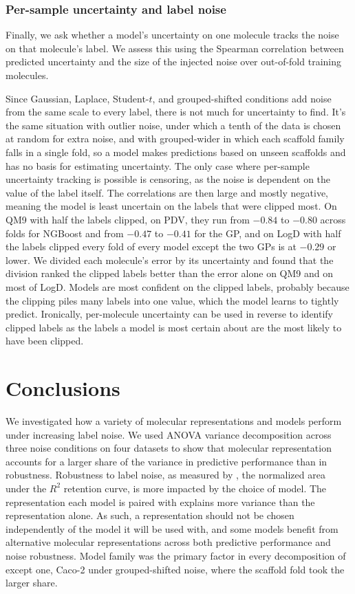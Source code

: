 \subsubsection{Per-sample uncertainty and label noise}\label{sec:uq_per_sample}

Finally, we ask whether a model's uncertainty on one molecule tracks the noise on that molecule's label. We assess this using the Spearman correlation between predicted uncertainty and the size of the injected noise over out-of-fold training molecules.

Since Gaussian, Laplace, Student-$t$, and grouped-shifted conditions add noise from the same scale to every label, there is not much for uncertainty to find. It's the same situation with outlier noise, under which a tenth of the data is chosen at random for extra noise, and with grouped-wider in which each scaffold family falls in a single fold, so a model makes predictions based on unseen scaffolds and has no basis for estimating uncertainty. The only case where per-sample uncertainty tracking is possible is censoring, as the noise is dependent on the value of the label itself. The correlations are then large and mostly negative, meaning the model is least uncertain on the labels that were clipped most. On QM9 with half the labels clipped, on PDV, they run from $-0.84$ to $-0.80$ across folds for NGBoost and from $-0.47$ to $-0.41$ for the GP, and on LogD with half the labels clipped every fold of every model except the two GPs is at $-0.29$ or lower. We divided each molecule's error by its uncertainty and found that the division ranked the clipped labels better than the error alone on QM9 and on most of LogD. Models are most confident on the clipped labels, probably because the clipping piles many labels into one value, which the model learns to tightly predict. Ironically, per-molecule uncertainty can be used in reverse to identify clipped labels as the labels a model is most certain about are the most likely to have been clipped.

\section{Conclusions}

We investigated how a variety of molecular representations and models perform under increasing label noise. We used ANOVA variance decomposition across three noise conditions on four datasets to show that molecular representation accounts for a larger share of the variance in predictive performance than in robustness. Robustness to label noise, as measured by \aucnorm, the normalized area under the $R^2$ retention curve, is more impacted by the choice of model. The representation each model is paired with explains more variance than the representation alone. As such, a representation should not be chosen independently of the model it will be used with, and some models benefit from alternative molecular representations across both predictive performance and noise robustness. Model family was the primary factor in every decomposition of \aucnorm{} except one, Caco-2 under grouped-shifted noise, where the scaffold fold took the larger share.

